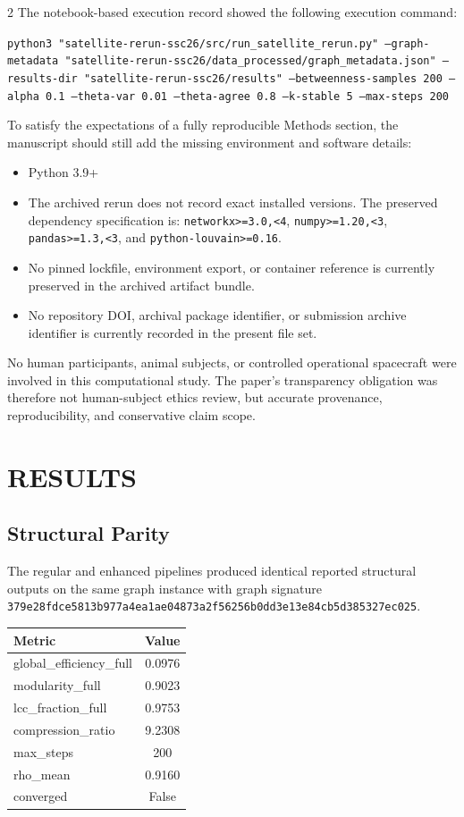 \documentclass[fleqn,10pt,letterpaper]{article}
\begin{document}
\begin{multicols}{2}
The notebook-based execution record showed the following execution command:

\texttt{python3 "satellite-rerun-ssc26/src/run\_satellite\_rerun.py" --graph-metadata "satellite-rerun-ssc26/data\_processed/graph\_metadata.json" --results-dir "satellite-rerun-ssc26/results" --betweenness-samples 200 --alpha 0.1 --theta-var 0.01 --theta-agree 0.8 --k-stable 5 --max-steps 200}

To satisfy the expectations of a fully reproducible Methods section, the manuscript should still add the missing environment and software details:

\begin{itemize}
\item Python 3.9+
\item The archived rerun does not record exact installed versions. The preserved dependency specification is: \texttt{networkx>=3.0,<4}, \texttt{numpy>=1.20,<3}, \texttt{pandas>=1.3,<3}, and \texttt{python-louvain>=0.16}.
\item No pinned lockfile, environment export, or container reference is currently preserved in the archived artifact bundle.
\item No repository DOI, archival package identifier, or submission archive identifier is currently recorded in the present file set.
\end{itemize}
No human participants, animal subjects, or controlled operational spacecraft were involved in this computational study. The paper's transparency obligation was therefore not human-subject ethics review, but accurate provenance, reproducibility, and conservative claim scope.


\section{RESULTS}


\subsection{Structural Parity}

The regular and enhanced pipelines produced identical reported structural outputs on the same graph instance with graph signature \texttt{379e28fdce5813b977a4ea1ae04873a2f56256b0dd3e13e84cb5d385327ec025}.

\begin{center}
\label{tab:key_metrics}
\small
\begin{tabular}{lc}
\hline
Metric & Value \\
\hline
global\_efficiency\_full & 0.0976 \\
modularity\_full & 0.9023 \\
lcc\_fraction\_full & 0.9753 \\
compression\_ratio & 9.2308 \\
max\_steps & 200 \\
rho\_mean & 0.9160 \\
converged & False \\
\hline
\end{tabular}
\end{center}



\end{multicols}
\end{document}
